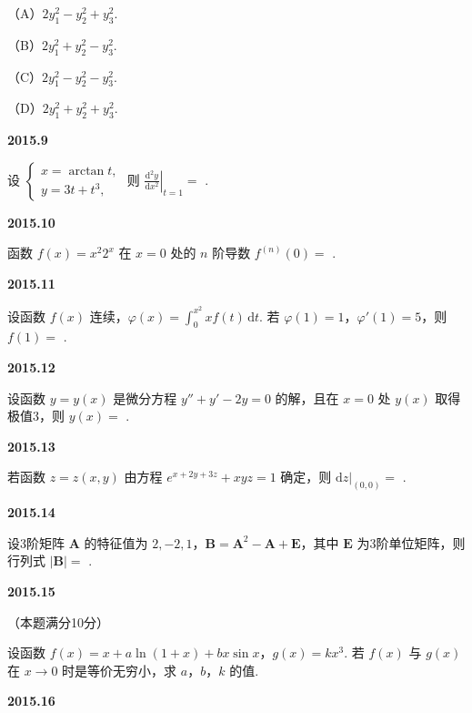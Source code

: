 \documentclass[UTF8,12pt,fontset=windows]{ctexart}
\begin{document}
（A）$2y_1^2 - y_2^2 + y_3^2$.

（B）$2y_1^2 + y_2^2 - y_3^2$.

（C）$2y_1^2 - y_2^2 - y_3^2$.

（D）$2y_1^2 + y_2^2 + y_3^2$.

\vfill
\newpage
{\large\bfseries 2015.9}

设 $\begin{cases} x = \arctan t, \\ y = 3t + t^3, \end{cases}$ 则 $\left.\frac{\mathrm{d}^2y}{\mathrm{d}x^2}\right|_{t = 1} =$ \underline{\hspace{20mm}}.

\vfill
\newpage
{\large\bfseries 2015.10}

函数 $f(x) = x^2 2^x$ 在 $x = 0$ 处的 $n$ 阶导数 $f^{(n)}(0) =$ \underline{\hspace{20mm}}.

\vfill
\newpage
{\large\bfseries 2015.11}

设函数 $f(x)$ 连续，$\varphi(x) = \int_0^{x^2} xf(t)\,\mathrm{d}t$. 若 $\varphi(1) = 1$，$\varphi'(1) = 5$，则 $f(1) =$ \underline{\hspace{20mm}}.

\vfill
\newpage
{\large\bfseries 2015.12}

设函数 $y = y(x)$ 是微分方程 $y'' + y' - 2y = 0$ 的解，且在 $x = 0$ 处 $y(x)$ 取得极值3，则 $y(x) =$ \underline{\hspace{20mm}}.

\vfill
\newpage
{\large\bfseries 2015.13}

若函数 $z = z(x, y)$ 由方程 $e^{x + 2y + 3z} + xyz = 1$ 确定，则 $\mathrm{d}z|_{(0, 0)} =$ \underline{\hspace{20mm}}.

\vfill
\newpage
{\large\bfseries 2015.14}

设3阶矩阵 $\boldsymbol{A}$ 的特征值为 $2, -2, 1$，$\boldsymbol{B} = \boldsymbol{A}^2 - \boldsymbol{A} + \boldsymbol{E}$，其中 $\boldsymbol{E}$ 为3阶单位矩阵，则行列式 $|\boldsymbol{B}| =$ \underline{\hspace{20mm}}.

\vfill
\newpage
{\large\bfseries 2015.15}

（本题满分10分）

设函数 $f(x) = x + a\ln(1 + x) + bx\sin x$，$g(x) = kx^3$. 若 $f(x)$ 与 $g(x)$ 在 $x \to 0$ 时是等价无穷小，求 $a$，$b$，$k$ 的值.

\vfill
\newpage
{\large\bfseries 2015.16}
\end{document}
